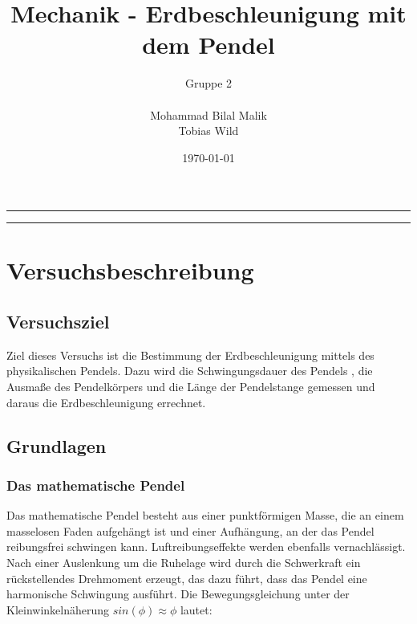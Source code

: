 \documentclass[a4paper, 11pt]{article}
\title{Mechanik - Erdbeschleunigung mit dem Pendel}
\author{Gruppe 2 \\ \\ Mohammad Bilal Malik \\ Tobias Wild}
\date{\today}
\begin{document}
\begin{titlepage}
	\vspace*{\fill}
	\begin{center}
		\textheight
		\vfill
		\newcommand{\Line}{\rule{\linewidth}{0.6mm}}
		\Line 
		{\let\newpage\relax\maketitle}
		\Line 
		\vfill
	\end{center}

	
	\vspace*{\fill}
	\thispagestyle{empty}
\end{titlepage}

\newpage
\thispagestyle{empty}
\tableofcontents
\newpage

\pagestyle{fancy}
\fancyhf{}
\fancyhead[L]{\nouppercase{\leftmark}}
\fancyhead[R]{\thepage}
\renewcommand{\headrulewidth}{0.5pt}
\fancyfoot[C]{\thepage}


\setcounter{page}{1}

\section{Versuchsbeschreibung}
\subsection{Versuchsziel}
Ziel dieses Versuchs ist die Bestimmung der Erdbeschleunigung mittels des physikalischen Pendels. Dazu wird die Schwingungsdauer des Pendels , die Ausmaße des Pendelkörpers und die Länge der Pendelstange gemessen und daraus die Erdbeschleunigung errechnet.\\

\subsection{Grundlagen}
\subsubsection{Das mathematische Pendel}
Das mathematische Pendel besteht aus einer punktförmigen Masse, die an einem masselosen Faden aufgehängt ist und einer Aufhängung, an der das Pendel reibungsfrei schwingen kann. Luftreibungseffekte werden ebenfalls vernachlässigt. Nach einer Auslenkung um die Ruhelage wird durch die Schwerkraft ein rückstellendes Drehmoment erzeugt, das dazu führt, dass das Pendel eine harmonische Schwingung ausführt. Die Bewegungsgleichung unter der Kleinwinkelnäherung $sin(\phi) \approx \phi$ lautet:
\end{document}
